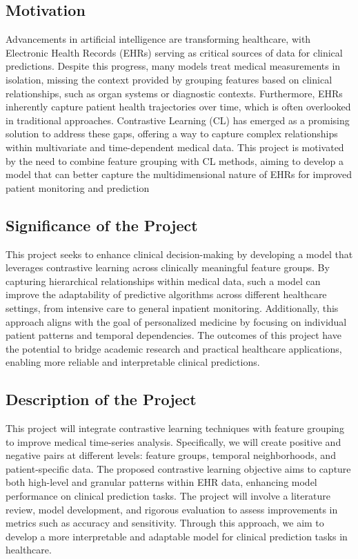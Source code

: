 \documentclass[a4paper]{article}
\begin{document}
\subsection{Motivation}
    Advancements in artificial intelligence are transforming healthcare, with Electronic Health Records (EHRs) serving as critical sources of data for clinical predictions. Despite this progress, many models treat medical measurements in isolation, missing the context provided by grouping features based on clinical relationships, such as organ systems or diagnostic contexts. Furthermore, EHRs inherently capture patient health trajectories over time, which is often overlooked in traditional approaches. Contrastive Learning (CL) has emerged as a promising solution to address these gaps, offering a way to capture complex relationships within multivariate and time-dependent medical data. This project is motivated by the need to combine feature grouping with CL methods, aiming to develop a model that can better capture the multidimensional nature of EHRs for improved patient monitoring and prediction
\subsection{Significance of the Project}
    This project seeks to enhance clinical decision-making by developing a model that leverages contrastive learning across clinically meaningful feature groups. By capturing hierarchical relationships within medical data, such a model can improve the adaptability of predictive algorithms across different healthcare settings, from intensive care to general inpatient monitoring. Additionally, this approach aligns with the goal of personalized medicine by focusing on individual patient patterns and temporal dependencies. The outcomes of this project have the potential to bridge academic research and practical healthcare applications, enabling more reliable and interpretable clinical predictions.
\subsection{Description of the Project}
    This project will integrate contrastive learning techniques with feature grouping to improve medical time-series analysis. Specifically, we will create positive and negative pairs at different levels: feature groups, temporal neighborhoods, and patient-specific data. The proposed contrastive learning objective aims to capture both high-level and granular patterns within EHR data, enhancing model performance on clinical prediction tasks. The project will involve a literature review, model development, and rigorous evaluation to assess improvements in metrics such as accuracy and sensitivity. Through this approach, we aim to develop a more interpretable and adaptable model for clinical prediction tasks in healthcare.
\end{document}
